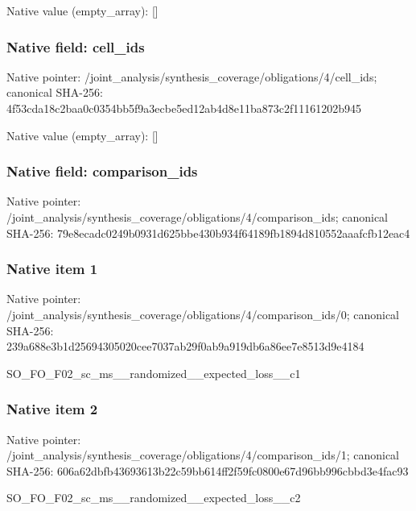 \documentclass[10pt,a4paper]{article}
\begin{document}
Native value (empty\_\allowbreak{}array): []

\subsubsection{Native field: cell\_\allowbreak{}ids}
Native pointer: /joint\_\allowbreak{}analysis/synthesis\_\allowbreak{}coverage/obligations/4/cell\_\allowbreak{}ids; canonical SHA-256: 4f53cda18c2baa0c0354bb5f9a3ecbe5ed12ab4d8e11ba873c2f11161202b945

Native value (empty\_\allowbreak{}array): []

\subsubsection{Native field: comparison\_\allowbreak{}ids}
Native pointer: /joint\_\allowbreak{}analysis/synthesis\_\allowbreak{}coverage/obligations/4/comparison\_\allowbreak{}ids; canonical SHA-256: 79e8ecadc0249b0931d625bbe430b934f64189fb1894d810552aaafcfb12eac4

\subsubsection{Native item 1}
Native pointer: /joint\_\allowbreak{}analysis/synthesis\_\allowbreak{}coverage/obligations/4/comparison\_\allowbreak{}ids/0; canonical SHA-256: 239a688e3b1d25694305020cee7037ab29f0ab9a919db6a86ee7e8513d9e4184

\begingroup\raggedright\sloppy SO\_\allowbreak{}FO\_\allowbreak{}F02\_\allowbreak{}sc\_\allowbreak{}ms\_\allowbreak{}\_\allowbreak{}randomized\_\allowbreak{}\_\allowbreak{}expected\_\allowbreak{}loss\_\allowbreak{}\_\allowbreak{}c1\par\endgroup

\subsubsection{Native item 2}
Native pointer: /joint\_\allowbreak{}analysis/synthesis\_\allowbreak{}coverage/obligations/4/comparison\_\allowbreak{}ids/1; canonical SHA-256: 606a62dbfb43693613b22c59bb614ff2f59fc0800e67d96bb996cbbd3e4fac93

\begingroup\raggedright\sloppy SO\_\allowbreak{}FO\_\allowbreak{}F02\_\allowbreak{}sc\_\allowbreak{}ms\_\allowbreak{}\_\allowbreak{}randomized\_\allowbreak{}\_\allowbreak{}expected\_\allowbreak{}loss\_\allowbreak{}\_\allowbreak{}c2\par\endgroup
\end{document}
